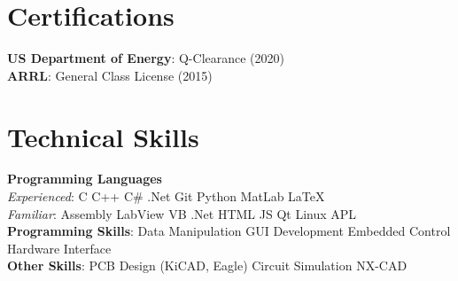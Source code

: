 \documentclass[letterpaper,11pt]{article}
\makeatletter
\newcommand{\resumeItem}[1]{
  \item\small{
    {#1 \vspace{-2pt}}
  }
}
\newcommand{\resumeProjectHeading}[2]{
    \item
    \begin{tabular*}{0.97\textwidth}{l@{\extracolsep{\fill}}r}
      \small#1 & #2 \\
    \end{tabular*}\vspace{-7pt}
}
\newcommand{\resumeSubHeadingListStart}{\begin{itemize}[leftmargin=0.15in, label={}]}
\newcommand{\resumeSubHeadingListEnd}{\end{itemize}}
\newcommand{\resumeItemListStart}{\begin{itemize}}
\newcommand{\resumeItemListEnd}{\end{itemize}\vspace{-5pt}}
\makeatother
\begin{document}
\section{Certifications}
\begin{itemize}[leftmargin=0.15in, label={}]
	\small{\item{
			\textbf{US Department of Energy}{: Q-Clearance (2020)}\\
			\textbf{ARRL}{: General Class License (2015)}	
	}}
\end{itemize}

\begin{comment}
\section{Projects}
    \resumeSubHeadingListStart
      \resumeProjectHeading
          {\textbf{Gitlytics} $|$ \emph{Python, Flask, React, PostgreSQL, Docker}}{June 2020 -- Present}
          \resumeItemListStart
            \resumeItem{Developed a full-stack web application using with Flask serving a REST API with React as the frontend}
            \resumeItem{Implemented GitHub OAuth to get data from user’s repositories}
            \resumeItem{Visualized GitHub data to show collaboration}
            \resumeItem{Used Celery and Redis for asynchronous tasks}
          \resumeItemListEnd
    \resumeSubHeadingListEnd
\end{comment}

%

\section{Technical Skills}
 \begin{itemize}[leftmargin=0.15in, label={}]
    \small{\item{
     \textbf{Programming Languages}\\
     \quad \textit{Experienced}{: C \textbullet{}  C++ \textbullet{} C\# .Net \textbullet{}	Git \textbullet{} Python \textbullet{} MatLab} \textbullet{} \LaTeX\ \\
     \quad \textit{Familiar}{: Assembly \textbullet{} LabView \textbullet{} VB .Net \textbullet{} HTML \textbullet{} JS \textbullet{} Qt \textbullet{} Linux \textbullet{} APL} \\
     \textbf{Programming Skills}{: Data Manipulation \textbullet{} GUI Development \textbullet{} Embedded Control \textbullet{} Hardware Interface} \\
     \textbf{Other Skills}{: PCB Design (KiCAD, Eagle) \textbullet{} Circuit Simulation} \textbullet{} NX-CAD\\
    }}
 \end{itemize}
\end{document}
